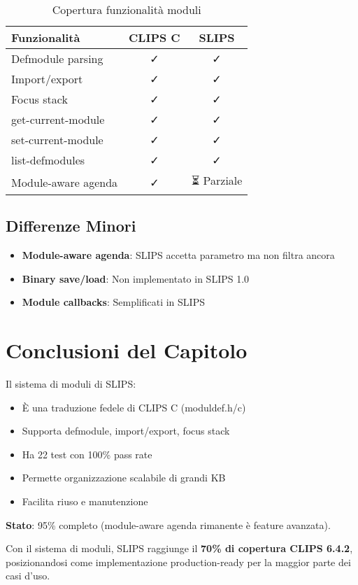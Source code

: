 \begin{table}[h]
\centering
\begin{tabular}{@{}lcc@{}}
\toprule
\textbf{Funzionalità} & \textbf{CLIPS C} & \textbf{SLIPS} \\
\midrule
Defmodule parsing & ✓ & ✓ \\
Import/export & ✓ & ✓ \\
Focus stack & ✓ & ✓ \\
get-current-module & ✓ & ✓ \\
set-current-module & ✓ & ✓ \\
list-defmodules & ✓ & ✓ \\
Module-aware agenda & ✓ & ⏳ Parziale \\
\bottomrule
\end{tabular}
\caption{Copertura funzionalità moduli}
\label{tab:module_coverage}
\end{table}

\subsection{Differenze Minori}

\begin{itemize}
\item \textbf{Module-aware agenda}: SLIPS accetta parametro ma non filtra ancora
\item \textbf{Binary save/load}: Non implementato in SLIPS 1.0
\item \textbf{Module callbacks}: Semplificati in SLIPS
\end{itemize}

\section{Conclusioni del Capitolo}

Il sistema di moduli di SLIPS:

\begin{itemize}
\item È una traduzione fedele di CLIPS C (moduldef.h/c)
\item Supporta defmodule, import/export, focus stack
\item Ha 22 test con 100\% pass rate
\item Permette organizzazione scalabile di grandi KB
\item Facilita riuso e manutenzione
\end{itemize}

\textbf{Stato}: 95\% completo (module-aware agenda rimanente è feature avanzata).

\begin{successbox}[Achievement]
Con il sistema di moduli, SLIPS raggiunge il \textbf{70\% di copertura CLIPS 6.4.2}, posizionandosi come implementazione production-ready per la maggior parte dei casi d'uso.
\end{successbox}


